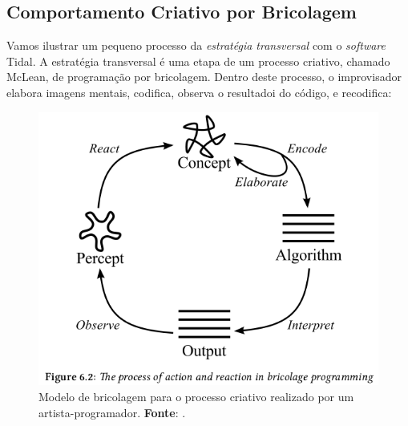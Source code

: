  
\subsection{Comportamento Criativo por Bricolagem}\label{sec:tidal}

Vamos ilustrar um pequeno processo da \emph{estratégia transversal} com o \emph{software} Tidal. A estratégia transversal é uma etapa de um processo criativo, chamado McLean, de programação por bricolagem. Dentro deste processo, o improvisador elabora imagens mentais, codifica, observa o resultadoi do código, e recodifica:

\begin{figure}[h]
  \centering
  \includegraphics[scale=0.5]{imagens/processo_criativo.png}
  \caption{Modelo de bricolagem para o processo criativo realizado por um artista-programador. \textbf{Fonte}: . }
  \label{fig:processo_criativo}
\end{figure}

